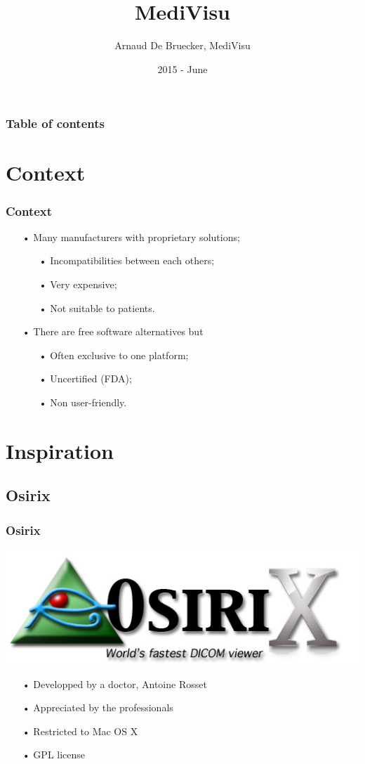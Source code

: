 \documentclass[11pt]{beamer}
\author{Arnaud De Bruecker, MediVisu}
\title{MediVisu}
\institute{HEB - ESI}
\date{2015 - June}
\begin{document}
\begin{frame}
\titlepage
\end{frame}

\begin{frame}
\frametitle{Table of contents}
\tableofcontents
\end{frame}

\section{Context}

\begin{frame}
\frametitle{Context}
\begin{itemize}[<+->]
\item[•] Many manufacturers with proprietary solutions;
\begin{itemize}[<+->]
\item[•] Incompatibilities between each others;
\item[•] Very expensive;
\item[•] Not suitable to patients.
\end{itemize}
\item[•] There are free software alternatives but
\begin{itemize}[<+->]
\item[•] Often exclusive to one platform;
\item[•] Uncertified (FDA);
\item[•] Non user-friendly.
\end{itemize}
\end{itemize}
\end{frame}

\section{Inspiration}

\subsection{Osirix}

\begin{frame}
\frametitle{Osirix}
\includegraphics[scale=0.17]{Osirix.jpg}
\begin{itemize}[<+->]
\item[•] Developped by a doctor, Antoine Rosset
\item[•] Appreciated by the professionals
\item[•] Restricted to Mac OS X
\item[•] GPL license
\end{itemize}
\end{frame}
\end{document}
